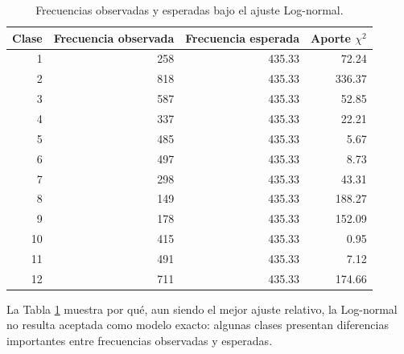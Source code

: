 \begin{table}[H]
\centering
\footnotesize
\caption{Frecuencias observadas y esperadas bajo el ajuste Log-normal.}
\label{tab:clases-lognormal}
\begin{tabular}{rrrr}
\toprule
Clase & Frecuencia observada & Frecuencia esperada & Aporte \(\chi^2\) \\
\midrule
1 & 258 & 435.33 & 72.24 \\
2 & 818 & 435.33 & 336.37 \\
3 & 587 & 435.33 & 52.85 \\
4 & 337 & 435.33 & 22.21 \\
5 & 485 & 435.33 & 5.67 \\
6 & 497 & 435.33 & 8.73 \\
7 & 298 & 435.33 & 43.31 \\
8 & 149 & 435.33 & 188.27 \\
9 & 178 & 435.33 & 152.09 \\
10 & 415 & 435.33 & 0.95 \\
11 & 491 & 435.33 & 7.12 \\
12 & 711 & 435.33 & 174.66 \\
\bottomrule
\end{tabular}
\end{table}

La Tabla \ref{tab:clases-lognormal} muestra por qué, aun siendo el mejor ajuste relativo, la Log-normal no resulta aceptada como modelo exacto: algunas clases presentan diferencias importantes entre frecuencias observadas y esperadas.
